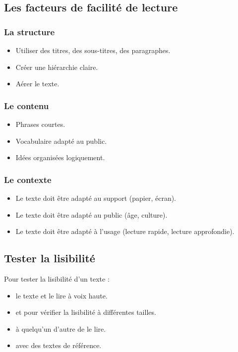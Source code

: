 \subsection{Les facteurs de facilité de lecture}

\subsubsection{La structure}

\begin{itemize}
    \item Utiliser des titres, des sous-titres, des paragraphes.
    \item Créer une hiérarchie claire.
    \item Aérer le texte.
\end{itemize}

\subsubsection{Le contenu}

\begin{itemize}
    \item Phrases courtes.
    \item Vocabulaire adapté au public.
    \item Idées organisées logiquement.
\end{itemize}

\subsubsection{Le contexte}

\begin{itemize}
    \item Le texte doit être adapté au support (papier, écran).
    \item Le texte doit être adapté au public (âge, culture).
    \item Le texte doit être adapté à l'usage (lecture rapide, lecture approfondie).
\end{itemize}

\subsection{Tester la lisibilité}

Pour tester la lisibilité d'un texte :

\begin{itemize}
    \item {} le texte et le lire à voix haute.
    \item {} et  pour vérifier la lisibilité à différentes tailles.
    \item {} à quelqu'un d'autre de le lire.
    \item {} avec des textes de référence.
\end{itemize}

